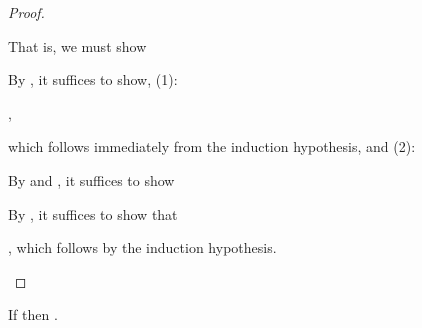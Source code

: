 \begin{proof}
\begin{proofcases}
    That is, we must show

    \im{\pcctyjudg{\pcclenv}{\pccnunpacke{\pccalpha,\pccn,\pccf}{\cctrans{\se}}{\pccappe{\pccf}{\pccn~\cctrans{\sepr}}}}{\cctrans{(\subst{\sB}{\sepr}{\sx})}}}

    By , it suffices to show, (1):

    \im{\pcctyjudg{\pcclenv}{\cctrans{\se}}{\pccnexistty{\pccalpha:\pccstarty,\pccn:\pccalpha}{\pcctrlufunty{\pccn}{\pcccodety{\pccx:\cctrans{\sA}}{\cctrans{\sB}}}}}},

    which follows immediately from the induction hypothesis, and (2):

    \im{\pcctyjudg{\pcclenv,\pccalpha:\pccstarty,\pccn:\pccalpha,\pccf:\pcctrlufunty{\pccn}{\pcccodety{\pccx:\cctrans{\sA}}{\cctrans{\sB}}}}{\pccappe{\pccf}{\pccn~\cctrans{\sepr}}}{\cctrans{(\subst{\sB}{\sepr}{\sx})}}}

    By  and , it suffices to show

    \im{\pcctyjudg{\pcclenv,\pccalpha:\pccstarty,\pccn:\pccalpha,\pccf:\pcctrlufunty{\pccn}{\pcccodety{\pccx:\cctrans{\sA}}{\cctrans{\sB}}}}{\pccappe{\pccf}{\pccn~\cctrans{\sepr}}}{\subst{\cctrans{\sB}}{\cctrans{\sepr}}{\pccx}}}

    By , it suffices to show that

    \im{\pcctyjudg{\pcclenv,\pccalpha:\pccstarty,\pccn:\pccalpha,\pccy:\pcctrlufunty{\pccn}{\pcccodety{\pccx:\cctrans{\sA}}{\cctrans{\sB}}}}{\cctrans{\sepr}}{\cctrans{\sA}}},
    which follows by the induction hypothesis.
  \end{proofcases}
\end{proof}

\begin{corollary}
  If \im{\styjudg{\slenv}{\se}{\sA}} then \im{\pcctyjudg{\cctrans{\slenv}}{\cctrans{\se}}{\cctrans{\sA}}}.
\end{corollary}


